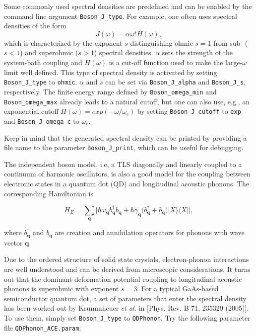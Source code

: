 \documentclass{scrartcl}
\begin{document}
Some commonly used spectral densities are predefined and can be 
enabled by the command line argument \verb+Boson_J_type+. 
For example, one often uses spectral densities of the form 
\begin{equation}
J(\omega)=\alpha \omega^s  H(\omega),
\end{equation}
which is characterized by the exponent $s$ distinguishing ohmic $s=1$ from
sub- ($s<1$) and superohmic ($s>1$) spectral densities. $\alpha$ sets the
strength of the system-bath coupling and $H(\omega)$ is a cut-off function
used to make the large-$\omega$ limit well defined. 
This type of spectral density is activated by setting \verb+Boson_J_type+
to \verb+ohmic+.
$\alpha$ and $s$ can be set via \verb+Boson_J_alpha+ and \verb+Boson_J_s+,
respectively. The finite energy range defined by \verb+Boson_omega_min+ and
\verb+Boson_omega_max+ already leads to a natural cutoff, but one can 
also use, e.g., an exponential cutoff $H(\omega)=exp(-\omega/\omega_c)$ 
by setting \verb+Boson_J_cutoff+ to \verb+exp+ and \verb+Boson_J_omega_c+
to $\omega_c$.

Keep in mind that the generated spectral density can be printed by 
providing a file name to the parameter \verb+Boson_J_print+, which can be 
useful for debugging.


The independent boson model, i.e, a TLS diagonally and linearly coupled 
to a continuum of harmonic oscillators, is also a good model for 
the coupling between electronic states in a quantum dot (QD) and longitudinal
acoustic phonons. The corresponding Hamiltonian is

\begin{equation}
H_E=\sum_{\mathbf{q}}\bigg[
\hbar\omega_{\mathbf{q}} b^\dagger_{\mathbf{q}}b_{\mathbf{q}}+
\hbar\gamma_{\mathbf{q}} \big( b^\dagger_{\mathbf{q}}+b_{\mathbf{q}}\big)
|X\rangle\langle X|\bigg],
\end{equation}

where $b^\dagger_{\mathbf{q}}$ and $b_{\mathbf{q}}$ are creation and
annihilation operators for phonons with wave vector $\mathbf{q}$.

Due to the ordered structure of solid state crystals, 
electron-phonon interactions are well understood and can be derived from
microscopic considerations. It turns out that the dominant 
deformation potential coupling to longitudinal acoustic phonons is 
superohmic with exponent $s=3$.
For a typical GaAs-based semiconductor quantum dot, 
a set of parameters that enter the spectral density has been worked out 
by Krummheuer \textit{et al.} in [Phys. Rev. B 71, 235329 (2005)].
To use them, simply set \verb+Boson_J_type+ to \verb+QDPhonon+.
Try the following parameter file \verb+QDPhonon_ACE.param+:
\end{document}
